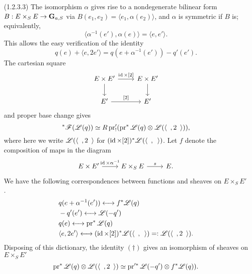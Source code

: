\documentclass[deligne.tex]{subfiles}
\begin{document}
(1.2.3.3)
The isomorphism $\alpha$ gives rise to a nondegenerate bilinear form
$B:E\times_S E\rightarrow\mathbf{G}_{a,S}$ via $B(e_1,e_2)=\langle e_1,\alpha(e_2)\rangle$,
and $\alpha$ is symmetric if $B$ is; equivalently,
\begin{equation*}
	\langle \alpha^{-1}(e'),\alpha(e)\rangle=\langle e,e'\rangle.
\end{equation*}
This allows the easy verification of the identity
\begin{equation*}\tag{$\dagger$}
	q(e)+\langle e,2e'\rangle=q(e+\alpha^{-1}(e'))-q'(e').
\end{equation*}
The cartesian square
\begin{equation*}\begin{tikzcd}
	E\times E'\arrow[r,"{\id\times[2]}"]\arrow[d]&E\times E'\arrow[d] \\
	E'\arrow[r,"{[2]}"]&E'
\end{tikzcd}\end{equation*}
and proper base change gives
\begin{equation*}
	[2]^*\mathscr F(\mathscr L(q))\simeq
	R\pr_!'(\pr^*\mathscr L(q)\otimes\mathscr L(\langle\enskip,2\enskip\rangle)),
\end{equation*}
where here we write $\mathscr L(\langle\enskip,2\enskip\rangle$ for
$(\operatorname{id}\times[2])^*\mathscr L(\langle\enskip,\enskip\rangle)$.
Let $f$ denote the composition of maps in the diagram
\begin{equation*}\begin{tikzcd}
	E\times E'\arrow[r,"\id\times\alpha^{-1}"]&E\times_SE\arrow[r,"s"]&E.
\end{tikzcd}\end{equation*}
We have the following correspondences between functions and sheaves on
$E\times_SE'$.
\begin{align*}
	&q(e+\alpha^{-1}(e'))\longleftrightarrow f^*\mathscr L(q) \\
	&-q'(e')\longleftrightarrow\mathscr L(-q') \\
	&q(e)\longleftrightarrow\operatorname{pr}^*\mathscr L(q) \\
	&\langle e,2e'\rangle\longleftrightarrow(\operatorname{id}\times[2])^*\mathscr L(\langle\enskip,\enskip\rangle)=:\mathscr L(\langle\enskip,2\enskip\rangle).
\end{align*}
Disposing of this dictionary, the identity $(\dagger)$ gives an isomorphism
of sheaves on $E\times_SE'$
\begin{equation*}
	\operatorname{pr}^*\mathscr L(q)\otimes\mathscr L(\langle\enskip,2\enskip\rangle)
	\simeq\operatorname{pr}'^*\mathscr L(-q')\otimes f^*\mathscr L(q)).
\end{equation*}
\end{document}
